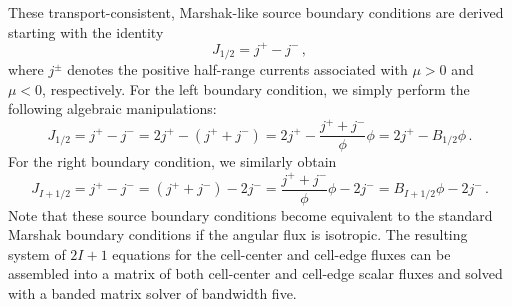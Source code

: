 These transport-consistent, Marshak-like source boundary conditions are derived starting with the identity
\begin{equation}
J_{1/2}=j^+ - j^- \,,
\end{equation}
where $j^\pm$ denotes the positive half-range currents associated with $\mu >0$ and $\mu <0$, respectively.  For the left boundary condition, we simply perform the following algebraic manipulations:
\begin{equation}
J_{1/2} = j^+ - j^-  = 2j^+ - (j^+ + j^-) = 2j^+ - \frac{j^+ + j^-}{\phi} \phi = 2j^+ - B_{1/2} \phi  \, .
\end{equation}
For the right boundary condition, we similarly obtain
\begin{equation}
J_{I+1/2} = j^+ - j^-  = (j^+ + j^-) - 2j^- = \frac{j^+ + j^-}{\phi} \phi - 2j^- = B_{I+1/2} \phi - 2j^-\, .
\end{equation}
Note that these source boundary conditions become equivalent to the standard Marshak boundary conditions if the \SN angular flux 
is isotropic. 
The resulting system of $2I+1$ equations for the cell-center and cell-edge fluxes can be assembled into a matrix of both cell-center and cell-edge scalar fluxes and solved with a banded matrix solver of bandwidth five. 

	
	
